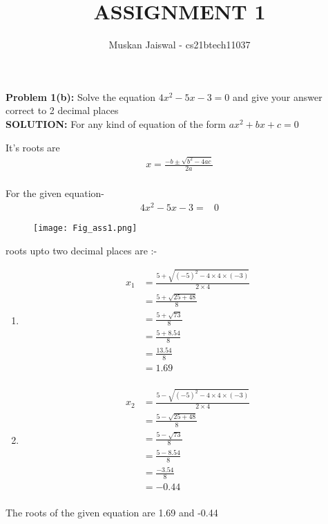 \documentclass[journal,12pt,two column]{IEEEtran}
\title{ASSIGNMENT 1 }
\author{Muskan Jaiswal - cs21btech11037}
\begin{document}
\maketitle
\textbf{Problem 1(b):} Solve the equation $4x^2-5x-3=0$ and give your answer correct to 2 decimal places
\\

\textbf{SOLUTION:}     For any kind of equation of the form  $ax^2+bx+c=0$

It's roots are
\\

\begin{align*}
x={\frac{-b\pm\sqrt{b^2-4ac}}{2a}}\\
\end{align*}

For the given equation-
\begin{align}
    4x^2-5x-3=&0
\end{align}
\begin{figure}
\texttt{[image: Fig\_ass1.png]}
\end{figure}

roots upto two decimal places are :-
    
 \begin{enumerate}
     \item 
 \begin{align*} 
x_1 &= \frac{5+\sqrt{(-5)^2-4\times4\times(-3)}}{2\times4}\\ 
&=\frac{5+\sqrt{25+48}}{8}\\ 
&=\frac{5+\sqrt{73}}{8}\\
 &=\frac{5+8.54}{8} \\ 
 &=\frac{13.54}{8}\\ 
 &=1.69 \\ 
\end{align*}
\item
\begin{align*}
x_2 &=\frac{5-\sqrt{(-5)^2-4\times4\times(-3)}}{2\times4}\\ 
&=\frac{5-\sqrt{25+48}}{8}\\ 
&=\frac{5-\sqrt{73}}{8}\\ 
&=\frac{5-8.54}{8} \\ 
&=\frac{-3.54}{8} \\ 
&=-0.44\\
\end{align*}
\end{enumerate}

The roots of the given equation are 1.69 and -0.44
\end{document}
